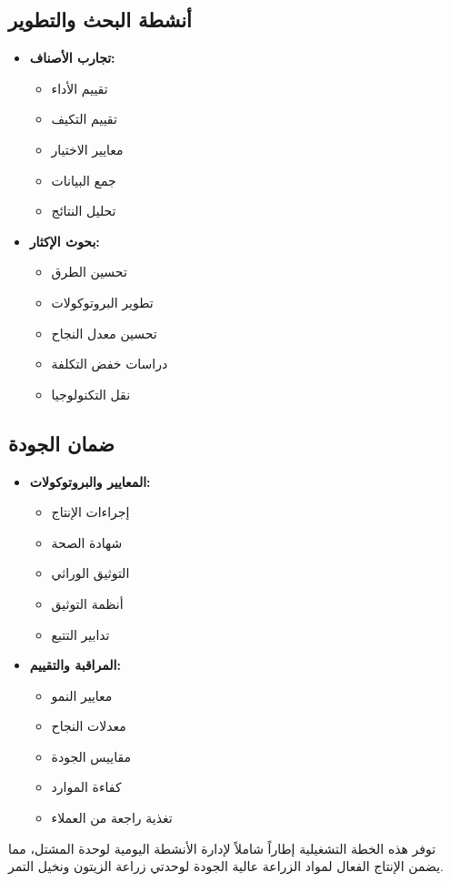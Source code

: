 \subsection{أنشطة البحث والتطوير}
\begin{itemize}
    \item \textbf{تجارب الأصناف:}
    \begin{itemize}
        \item تقييم الأداء
        \item تقييم التكيف
        \item معايير الاختيار
        \item جمع البيانات
        \item تحليل النتائج
    \end{itemize}
    
    \item \textbf{بحوث الإكثار:}
    \begin{itemize}
        \item تحسين الطرق
        \item تطوير البروتوكولات
        \item تحسين معدل النجاح
        \item دراسات خفض التكلفة
        \item نقل التكنولوجيا
    \end{itemize}
\end{itemize}

\subsection{ضمان الجودة}
\begin{itemize}
    \item \textbf{المعايير والبروتوكولات:}
    \begin{itemize}
        \item إجراءات الإنتاج
        \item شهادة الصحة
        \item التوثيق الوراثي
        \item أنظمة التوثيق
        \item تدابير التتبع
    \end{itemize}
    
    \item \textbf{المراقبة والتقييم:}
    \begin{itemize}
        \item معايير النمو
        \item معدلات النجاح
        \item مقاييس الجودة
        \item كفاءة الموارد
        \item تغذية راجعة من العملاء
    \end{itemize}
\end{itemize}

توفر هذه الخطة التشغيلية إطاراً شاملاً لإدارة الأنشطة اليومية لوحدة المشتل، مما يضمن الإنتاج الفعال لمواد الزراعة عالية الجودة لوحدتي زراعة الزيتون ونخيل التمر. 
